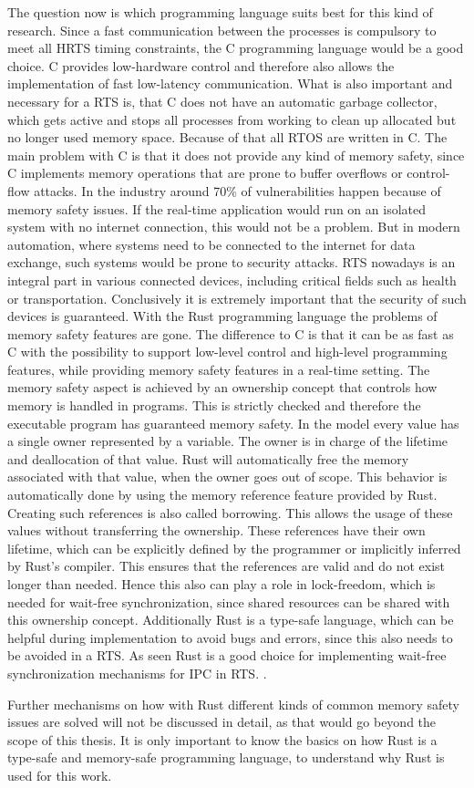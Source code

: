The question now is which programming language suits best for this kind of research. Since a fast communication between the processes is compulsory to meet all \ac{HRTS} timing constraints, the C programming language would be a good choice. C provides low-hardware control and therefore also allows the implementation of fast low-latency communication. What is also important and necessary for a \ac{RTS} is, that C does not have an automatic garbage collector, which gets active and stops all processes from working to clean up allocated but no longer used memory space. Because of that all \ac{RTOS} are written in C. The main problem with C is that it does not provide any kind of memory safety, since C implements memory operations that are prone to buffer overflows or control-flow attacks. In the industry around 70\% of vulnerabilities happen because of memory safety issues. If the real-time application would run on an isolated system with no internet connection, this would not be a problem. But in modern automation, where systems need to be connected to the internet for data exchange, such systems would be prone to security attacks. \ac{RTS} nowadays is an integral part in various connected devices, including critical fields such as health or transportation. Conclusively it is extremely important that the security of such devices is guaranteed. With the Rust programming language the problems of memory safety features are gone. The difference to C is that it can be as fast as C with the possibility to support low-level control and high-level programming features, while providing memory safety features in a real-time setting. The memory safety aspect is achieved by an ownership concept that controls how memory is handled in programs. This is strictly checked and therefore the executable program has guaranteed memory safety. In the model every value has a single owner represented by a variable. The owner is in charge of the lifetime and deallocation of that value. Rust will automatically free the memory associated with that value, when the owner goes out of scope. This behavior is automatically done by using the memory reference feature provided by Rust. Creating such references is also called borrowing. This allows the usage of these values without transferring the ownership. These references have their own lifetime, which can be explicitly defined by the programmer or implicitly inferred by Rust's compiler. This ensures that the references are valid and do not exist longer than needed. Hence this also can play a role in lock-freedom, which is needed for wait-free synchronization, since shared resources can be shared with this ownership concept. Additionally Rust is a type-safe language, which can be helpful during implementation to avoid bugs and errors, since this also needs to be avoided in a \ac{RTS}. As seen Rust is a good choice for implementing wait-free synchronization mechanisms for \ac{IPC} in \ac{RTS}. \cite{xu2023rust, culic2022lowRust}. 

Further mechanisms on how with Rust different kinds of common memory safety issues are solved will not be discussed in detail, as that would go beyond the scope of this thesis. It is only important to know the basics on how Rust is a type-safe and memory-safe programming language, to understand why Rust is used for this work.